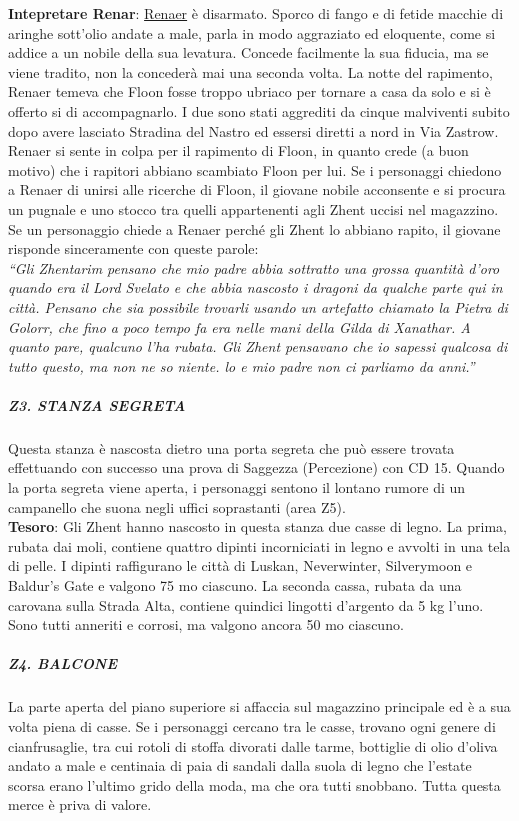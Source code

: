 \documentclass{article}
\begin{document}
\textbf{Intepretare Renar}: \hyperlink{Reaner}{Renaer} è disarmato. Sporco di fango e di fetide macchie di
aringhe sott'olio andate a male, parla in modo aggraziato
ed eloquente, come si addice a un nobile della sua levatura.
Concede facilmente la sua fiducia, ma se viene tradito, non
la concederà mai una seconda volta.
La notte del rapimento, Renaer temeva che Floon fosse
troppo ubriaco per tornare a casa da solo e si è offerto si
di accompagnarlo. I due sono stati aggrediti da cinque
malviventi subito dopo avere lasciato Stradina del Nastro
ed essersi diretti a nord in Via Zastrow.
Renaer si sente in colpa per il rapimento di Floon,
in quanto crede (a buon motivo) che i rapitori abbiano scambiato Floon per lui. Se i personaggi chiedono a
Renaer di unirsi alle ricerche di Floon, il giovane nobile
acconsente e si procura un pugnale e uno stocco tra quelli
appartenenti agli Zhent uccisi nel magazzino.
Se un personaggio chiede a Renaer perché gli Zhent
lo abbiano rapito, il giovane risponde sinceramente con
queste parole: \\

\textit{“Gli Zhentarim pensano che mio padre abbia sottratto
una grossa quantità d'oro quando era il Lord Svelato
e che abbia nascosto i dragoni da qualche parte qui
in città. Pensano che sia possibile trovarli usando un
artefatto chiamato la Pietra di Golorr, che fino a poco
tempo fa era nelle mani della Gilda di Xanathar. A quanto
pare, qualcuno l'ha rubata. Gli Zhent pensavano che io
sapessi qualcosa di tutto questo, ma non ne so niente. lo
e mio padre non ci parliamo da anni.”}


                        \subparagraph{Z3. STANZA SEGRETA}
Questa stanza è nascosta dietro una porta segreta che
può essere trovata effettuando con successo una prova di
Saggezza (Percezione) con CD 15. Quando la porta segreta
viene aperta, i personaggi sentono il lontano rumore di un
campanello che suona negli uffici soprastanti (area Z5). \\

\textbf{Tesoro}: Gli Zhent hanno nascosto in questa stanza due casse di
legno. La prima, rubata dai moli, contiene quattro dipinti
incorniciati in legno e avvolti in una tela di pelle. I dipinti raffigurano le città di Luskan, Neverwinter, Silverymoon e
Baldur's Gate e valgono 75 mo ciascuno.
La seconda cassa, rubata da una carovana sulla Strada
Alta, contiene quindici lingotti d'argento da 5 kg l'uno. Sono
tutti anneriti e corrosi, ma valgono ancora 50 mo ciascuno.


                        \subparagraph{Z4. BALCONE}
La parte aperta del piano superiore si affaccia sul
magazzino principale ed è a sua volta piena di casse. Se
i personaggi cercano tra le casse, trovano ogni genere di
cianfrusaglie, tra cui rotoli di stoffa divorati dalle tarme,
bottiglie di olio d'oliva andato a male e centinaia di paia
di sandali dalla suola di legno che l'estate scorsa erano
l'ultimo grido della moda, ma che ora tutti snobbano. Tutta
questa merce è priva di valore.
\end{document}
